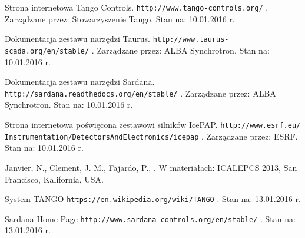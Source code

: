 \clearpage

\begin{thebibliography}{99} %

Strona internetowa Tango Controls.
\newblock \texttt{http://www.tango-controls.org/} .
\newblock Zarządzane przez: Stowarzyszenie Tango.
\newblock Stan na: 10.01.2016 r.

Dokumentacja zestawu narzędzi Taurus.
\newblock \texttt{http://www.taurus-scada.org/en/stable/} .
\newblock Zarządzane przez: ALBA Synchrotron.
\newblock Stan na: 10.01.2016 r.

Dokumentacja zestawu narzędzi Sardana.
\newblock \texttt{http://sardana.readthedocs.org/en/stable/} .
\newblock Zarządzane przez: ALBA Synchrotron.
\newblock Stan na: 10.01.2016 r.

Strona internetowa poświęcona zestawowi silników IcePAP.
\newblock \texttt{http://www.esrf.eu/\\Instrumentation/DetectorsAndElectronics/icepap} .
\newblock Zarządzane przez: ESRF.
\newblock Stan na: 10.01.2016 r.

Janvier, N., Clement, J. M., Fajardo, P.,  
.
\newblock W materiałach: ICALEPCS 2013, San Francisco, Kalifornia, USA.

System TANGO
\newblock \texttt{https://en.wikipedia.org/wiki/TANGO} .
\newblock Stan na: 13.01.2016 r.

Sardana Home Page
\newblock \texttt{http://www.sardana-controls.org/en/stable/} .
\newblock Stan na: 13.01.2016 r.



\end{thebibliography}